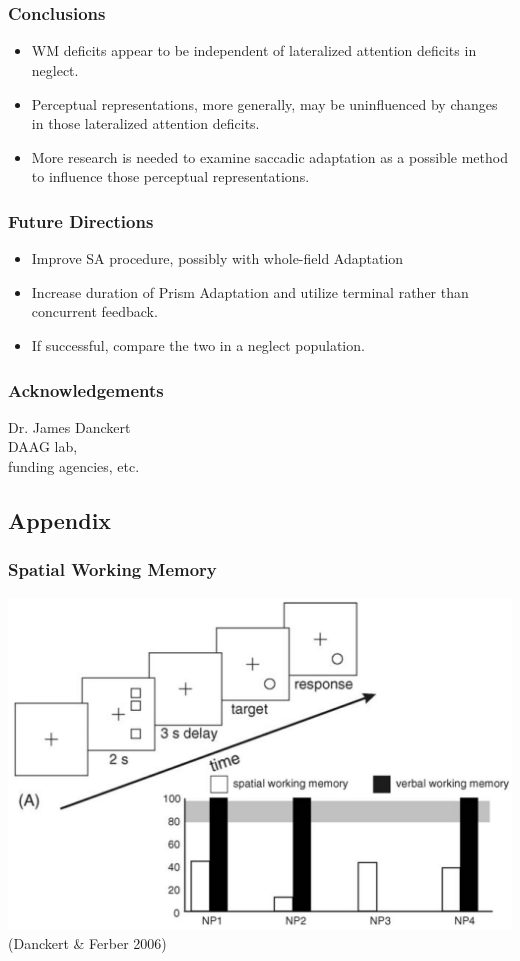 \documentclass{beamer}
\begin{document}
\section*{}
\begin{frame}
	\frametitle{Conclusions}
	\begin{itemize}
		\item WM deficits appear to be independent of lateralized attention deficits in neglect.
		\item Perceptual representations, more generally, may be uninfluenced by changes in those lateralized attention deficits.
		\item More research is needed to examine saccadic adaptation as a possible method to influence those perceptual representations.
	\end{itemize}
\end{frame}

\begin{frame}
	\frametitle{Future Directions}
	\begin{itemize}
		\item Improve SA procedure, possibly with whole-field Adaptation
		\item Increase duration of Prism Adaptation and utilize terminal rather than concurrent feedback.
		\item If successful, compare the two in a neglect population.
	\end{itemize}
\end{frame}

\begin{frame}
	\frametitle{Acknowledgements}
	Dr. James Danckert\\
	DAAG lab,\\
	funding agencies, etc.
\end{frame}


\subsection*{Appendix}

\end{document}
